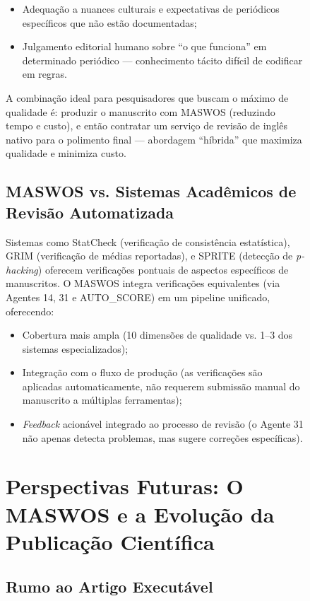 \begin{figure}
\begin{itemize}
    \item Adequação a nuances culturais e expectativas de
    periódicos específicos que não estão documentadas;

    \item Julgamento editorial humano sobre ``o que funciona''
    em determinado periódico — conhecimento tácito difícil de
    codificar em regras.
\end{itemize}

A combinação ideal para pesquisadores que buscam o máximo de
qualidade é: produzir o manuscrito com MASWOS (reduzindo tempo e
custo), e então contratar um serviço de revisão de inglês nativo
para o polimento final — abordagem ``híbrida'' que maximiza
qualidade e minimiza custo.

\subsection{MASWOS vs. Sistemas Acadêmicos de Revisão Automatizada}
\label{sec:vs_revisao}

Sistemas como StatCheck (verificação de consistência estatística),
GRIM (verificação de médias reportadas), e SPRITE (detecção de
\textit{p-hacking}) oferecem verificações pontuais de aspectos
específicos de manuscritos. O MASWOS integra verificações
equivalentes (via Agentes 14, 31 e AUTO\_SCORE) em um pipeline
unificado, oferecendo:

\begin{itemize}
    \item Cobertura mais ampla (10 dimensões de qualidade vs.
    1--3 dos sistemas especializados);

    \item Integração com o fluxo de produção (as verificações são
    aplicadas automaticamente, não requerem submissão manual do
    manuscrito a múltiplas ferramentas);

    \item \textit{Feedback} acionável integrado ao processo de
    revisão (o Agente 31 não apenas detecta problemas, mas sugere
    correções específicas).
\end{itemize}

\section{Perspectivas Futuras: O MASWOS e a Evolução da Publicação Científica}
\label{sec:perspectivas_futuras}

\subsection{Rumo ao Artigo Executável}
\label{sec:artigo_executavel}


\end{figure}
